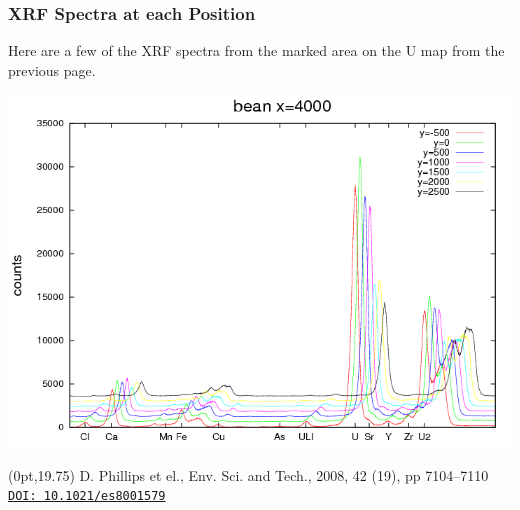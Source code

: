 \documentclass[10pt, xcolor=x11names, compress]{beamer}
\begin{document}
\begin{frame}
  \frametitle{XRF Spectra at each Position}

  Here are a few of the XRF spectra from the marked area on the U map
  from the previous page.
  \begin{center}
    \includegraphics[width=0.7\linewidth]{xrf/beanx=4000.png}
  \end{center}
  \begin{textblock*}{0.5\linewidth}(0pt,19.75\TPVertModule) \tiny
    D. Phillips et el., Env. Sci. and Tech., 2008, 42 (19), pp
    7104–7110
    \href{http://dx.doi.org/10.1021/es8001579}{\color{Blue4}\texttt{DOI:
        10.1021/es8001579}}
  \end{textblock*}
\end{frame}
\end{document}
